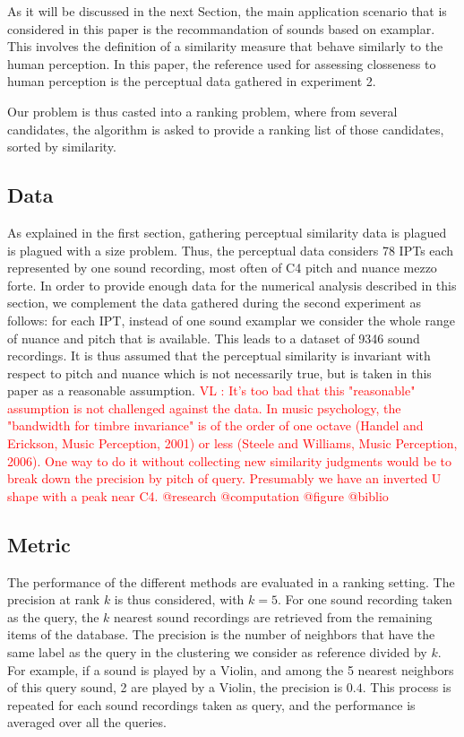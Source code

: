 \documentclass{article}
\newcommand{\ipt}{IPT\xspace}
\newcommand{\ipts}{IPTs\xspace}
\newcommand{\vl}[1]{\textcolor{red}{VL : #1}}
\begin{document}
As it will be discussed in the next Section, the main application scenario that is considered in this paper is the recommandation of sounds based on examplar. This involves the definition of a similarity measure that behave similarly to the human perception. In this paper, the reference used for assessing closseness to human perception is the perceptual data gathered in experiment 2.

Our problem is thus casted into a ranking problem, where from several candidates, the algorithm is asked to provide a ranking list of those candidates, sorted by similarity.

\subsection{Data}

As explained in the first section, gathering perceptual similarity data is plagued is plagued with a size problem. Thus, the perceptual data considers 78 \ipts each represented by one sound recording, most often of C4 pitch and nuance mezzo forte. In order to provide enough data for the numerical analysis described in this section, we complement the data gathered during the second experiment as follows: for each \ipt, instead of one sound examplar we consider the whole range of nuance and pitch that is available. This leads to a dataset of 9346 sound recordings. It is thus assumed that the perceptual similarity is invariant with respect to pitch and nuance which is not necessarily true, but is taken in this paper as a reasonable assumption.
\vl{It's too bad that this "reasonable" assumption is not challenged against the data. In music psychology, the "bandwidth for timbre invariance" is of the order of one octave (Handel and Erickson, Music Perception, 2001) or less (Steele and Williams, Music Perception, 2006).
One way to do it without collecting new similarity judgments would be to break down the precision by pitch of query.
Presumably we have an inverted U shape with a peak near C4.
@research @computation @figure @biblio}

\subsection{Metric}

The performance of the different methods are evaluated in a ranking setting. The precision at rank $k$ is thus considered, with $k=5$. For one sound recording taken as the query, the $k$ nearest sound recordings are retrieved from the remaining items of the database. The precision is the number of neighbors that have the same label as the query in the clustering we consider as reference divided by $k$. For example, if a sound is played by a Violin, and among the 5 nearest neighbors of this query sound, 2 are played by a Violin, the precision is $0.4$. This process is repeated for each sound recordings taken as query, and the performance is averaged over all the queries.
\end{document}
